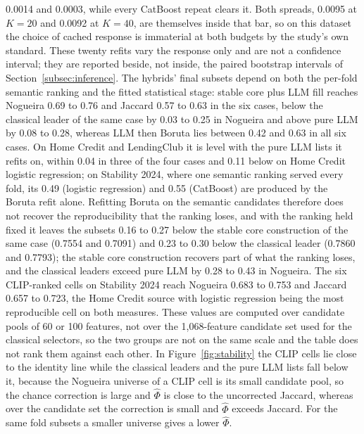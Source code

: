 \documentclass[final,5p,twocolumn]{elsarticle}
\newcommand{\Kfeat}{K}
\begin{document}
0.0014 and 0.0003, while every CatBoost repeat clears it. Both spreads, 0.0095 at $\Kfeat=20$ and 0.0092 at $\Kfeat=40$, are themselves inside that bar, so on this dataset the choice of cached response is immaterial at both budgets by the study's own standard. These twenty refits vary the response only and are not a confidence interval; they are reported beside, not inside, the paired bootstrap intervals of Section~\ref{subsec:inference}. The hybrids' final subsets depend on both the per-fold semantic ranking and the fitted statistical stage: stable core plus LLM fill reaches Nogueira 0.69 to 0.76 and Jaccard 0.57 to 0.63 in the six cases, below the classical leader of the same case by 0.03 to 0.25 in Nogueira and above pure LLM by 0.08 to 0.28, whereas LLM then Boruta lies between 0.42 and 0.63 in all six cases. On Home Credit and LendingClub it is level with the pure LLM lists it refits on, within 0.04 in three of the four cases and 0.11 below on Home Credit logistic regression; on Stability 2024, where one semantic ranking served every fold, its 0.49 (logistic regression) and 0.55 (CatBoost) are produced by the Boruta refit alone. Refitting Boruta on the semantic candidates therefore does not recover the reproducibility that the ranking loses, and with the ranking held fixed it leaves the subsets 0.16 to 0.27 below the stable core construction of the same case (0.7554 and 0.7091) and 0.23 to 0.30 below the classical leader (0.7860 and 0.7793); the stable core construction recovers part of what the ranking loses, and the classical leaders exceed pure LLM by 0.28 to 0.43 in Nogueira. The six CLIP-ranked cells on Stability 2024 reach Nogueira 0.683 to 0.753 and Jaccard 0.657 to 0.723, the Home Credit source with logistic regression being the most reproducible cell on both measures. These values are computed over candidate pools of 60 or 100 features, not over the 1,068-feature candidate set used for the classical selectors, so the two groups are not on the same scale and the table does not rank them against each other. In Figure~\ref{fig:stability} the CLIP cells lie close to the identity line while the classical leaders and the pure LLM lists fall below it, because the Nogueira universe of a CLIP cell is its small candidate pool, so the chance correction is large and $\hat\Phi$ is close to the uncorrected Jaccard, whereas over the candidate set the correction is small and $\hat\Phi$ exceeds Jaccard. For the same fold subsets a smaller universe gives a lower $\hat\Phi$.
\end{document}
